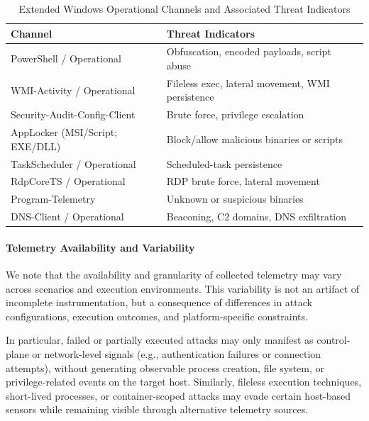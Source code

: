 \begin{table}[t]
\footnotesize
\setlength{\tabcolsep}{2pt}
\centering
\caption{Extended Windows Operational Channels and Associated Threat Indicators}
\label{tab:windows_extended}
\begin{tabular}{@{}lp{3.6cm}@{}}
\toprule
\textbf{Channel} & \textbf{Threat Indicators} \\
\midrule

PowerShell / Operational 
& Obfuscation, encoded payloads, script abuse \\

WMI-Activity / Operational 
& Fileless exec, lateral movement, WMI persistence \\

Security-Audit-Config-Client 
& Brute force, privilege escalation \\

AppLocker (MSI/Script; EXE/DLL) 
& Block/allow malicious binaries or scripts \\

TaskScheduler / Operational 
& Scheduled-task persistence \\

RdpCoreTS / Operational 
& RDP brute force, lateral movement \\

Program-Telemetry 
& Unknown or suspicious binaries \\

DNS-Client / Operational 
& Beaconing, C2 domains, DNS exfiltration \\

\bottomrule
\end{tabular}
\end{table}


\paragraph{Telemetry Availability and Variability}

We note that the availability and granularity of collected telemetry may vary across scenarios and execution environments. This variability is not an artifact of incomplete instrumentation, but a consequence of differences in attack configurations, execution outcomes, and platform-specific constraints. 

In particular, failed or partially executed attacks may only manifest as control-plane or network-level signals (e.g., authentication failures or connection attempts), without generating observable process creation, file system, or privilege-related events on the target host. Similarly, fileless execution techniques, short-lived processes, or container-scoped attacks may evade certain host-based sensors while remaining visible through alternative telemetry sources.

